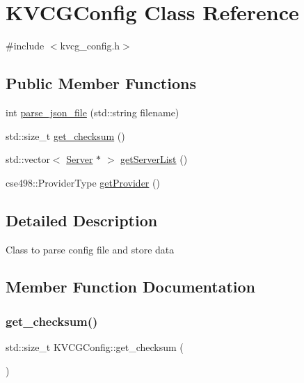 \hypertarget{classKVCGConfig}{}\section{K\+V\+C\+G\+Config Class Reference}
\label{classKVCGConfig}


{\ttfamily \#include $<$kvcg\+\_\+config.\+h$>$}

\subsection*{Public Member Functions}
\begin{DoxyCompactItemize}
\item 
int \mbox{\hyperlink{classKVCGConfig_a47206f279489aacccb9200f0bf9b36cf}{parse\+\_\+json\+\_\+file}} (std\+::string filename)
\item 
std\+::size\+\_\+t \mbox{\hyperlink{classKVCGConfig_a873ecf819a05b79ccced5e5dada7843f}{get\+\_\+checksum}} ()
\item 
std\+::vector$<$ \mbox{\hyperlink{classServer}{Server}} $\ast$ $>$ \mbox{\hyperlink{classKVCGConfig_a61fb9cd072f12acd361c7bed3936bd4b}{get\+Server\+List}} ()
\item 
cse498\+::\+Provider\+Type \mbox{\hyperlink{classKVCGConfig_a66862a874ddbbe54e7b696894b970539}{get\+Provider}} ()
\end{DoxyCompactItemize}


\subsection{Detailed Description}
Class to parse config file and store data 

\subsection{Member Function Documentation}
\mbox{\label{classKVCGConfig_a873ecf819a05b79ccced5e5dada7843f}} 
\subsubsection{\texorpdfstring{get\+\_\+checksum()}{get\_checksum()}}
{\footnotesize\ttfamily std\+::size\+\_\+t K\+V\+C\+G\+Config\+::get\+\_\+checksum (\begin{DoxyParamCaption}{ }\end{DoxyParamCaption})}

